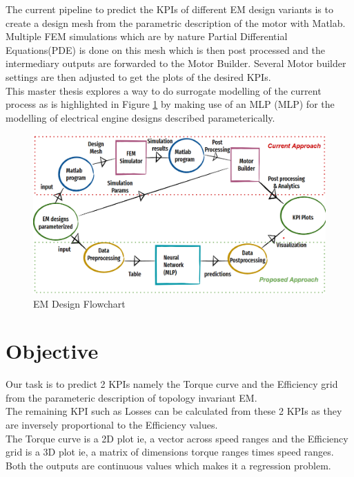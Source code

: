 \documentclass{report} %
\begin{document}
The current pipeline to predict the \ac{KPI}s of different \ac{EM} design variants is to create a design mesh from the parametric description of the motor with Matlab.
Multiple \ac{FEM} simulations which are by nature Partial Differential Equations(PDE) is done on this mesh which is then post processed and the intermediary outputs are forwarded to the Motor Builder.
Several Motor builder settings are then adjusted to get the plots of the desired \ac{KPI}s.\\
This master thesis explores a way to do surrogate modelling of the current process as is highlighted in Figure \ref{fig:EM Design Flowchart} by making use of an \acl{MLP} (\ac{MLP}) for the modelling of electrical engine designs described parameterically. \\
\begin{figure}[H]
    \centering
    \includegraphics[width=1\textwidth]{./ReportImages/EM_design_flowchart_v2.png} 
    \caption{EM Design Flowchart}
    \label{fig:EM Design Flowchart}
\end{figure}


\section{Objective}\label{sec:Objective}
Our task is to predict 2 KPIs namely the Torque curve and the Efficiency grid from the parameteric description of topology invariant \ac{EM}. \\ 
The remaining \ac{KPI} such as Losses can be calculated from these 2 KPIs as they are inversely proportional to the Efficiency values.\\
The Torque curve is a 2D plot ie, a vector across speed ranges and the Efficiency grid is a 3D plot ie, a matrix of dimensions torque ranges times speed ranges. \\
Both the outputs are continuous values which makes it a regression problem. \\
\end{document}
